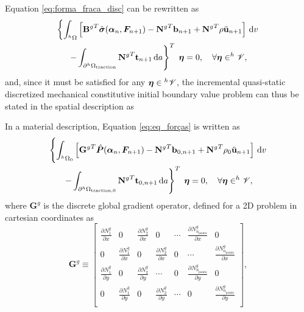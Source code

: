 Equation \eqref{eq:forma_fraca_disc} can be rewritten as
\begin{multline}
    \left\{  \int_{^h\Omega}\left[{\mathbf B^g}^T \hat{\bm{\sigma}}(\bm{\alpha}_n, \bm{F}_{n+1})-{\mathbf N^g}^T\mathbf b_{n+1} +{\mathbf N^g}^T\rho\ddot{\mathbf u}_{n+1} \right]\,\mathrm{d} v \right. \\ \left. -\int_{\partial ^h\Omega_\text{traction}} {\mathbf N^g}^T \mathbf t_{n+1}\,\mathrm{d} a\right\}^T\;\bm{\eta} =0,\quad \forall \bm{\eta} \in ^h \mathscr{V}, \label{eq:eq_forças}
\end{multline}
and, since it must be satisfied for any $\bm{\eta} \in {}^h \mathscr{V}$, the incremental quasi-static discretized mechanical constitutive initial boundary value problem can thus be stated in the spatial description as

In a material description, Equation \eqref{eq:eq_forças} is written as
\begin{multline}
     \left\{  \int_{^h\Omega_0}\left[{\mathbf G^g}^T \hat{\bm{P}}(\bm{\alpha}_n, \bm{F}_{n+1})-{\mathbf N^g}^T \mathbf b_{0,n+1} + {\mathbf N^g}^T \rho_0\ddot{\mathbf u}_{n+1} \right]\,\mathrm{d} v \right.\\ \left.   -\int_{\partial ^h\Omega_\text{traction,0}} {\mathbf N^g}^T \mathbf t_{0,n+1}\,\mathrm{d} a\right\}^T\;\bm{\eta} =0,\quad \forall \bm{\eta} \in ^h \mathscr{V},
\end{multline}
where $\mathbf G^g$ is the discrete global gradient operator, defined for a 2D problem in cartesian coordinates as
\begin{equation}
    \mathbf G^g\equiv \left[
    \begin{array}{ccccccc}
         \displaystyle{\frac{\partial N_1^g}{\partial x}} & 0 & \displaystyle{\frac{\partial N_2^g}{\partial x}} & 0 & \cdots &
         \displaystyle{\frac{\partial N_{n_\text{points}}^g}{\partial x}} & 0\\
         0 & \displaystyle{\frac{\partial N_1^g}{\partial x}} & 0 & \displaystyle{\frac{\partial N_2^g}{\partial x}} & 0 & \cdots &
         \displaystyle{\frac{\partial N_{n_\text{points}}^g}{\partial x}}\\
         \displaystyle{\frac{\partial N_1^g}{\partial y}} & 0 & \displaystyle{\frac{\partial N_2^g}{\partial y}} & \cdots &
         0 & \displaystyle{\frac{\partial N_{n_\text{points}}^g}{\partial y}} & 0\\
         0 & \displaystyle{\frac{\partial N_1^g}{\partial y}} & 0 & \displaystyle{\frac{\partial N_2^g}{\partial y}} & \cdots &
         0 & \displaystyle{\frac{\partial N_{n_\text{points}}^g}{\partial y}}\\
    \end{array}
    \right],
\end{equation}
